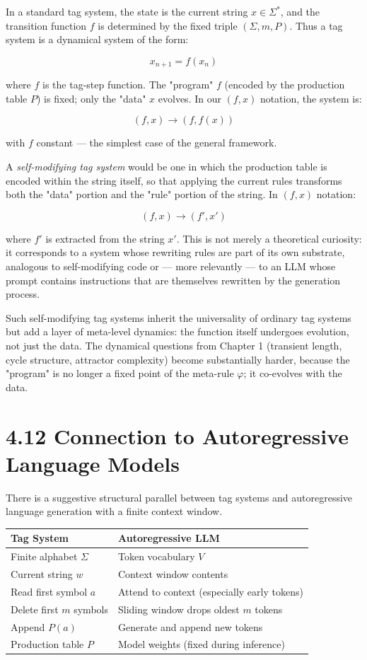 In a standard tag system, the state is the current string $x \in \Sigma^*$, and the transition function $f$ is determined by the fixed triple $(\Sigma, m, P)$. Thus a tag system is a dynamical system of the form:

\[
x_{n+1} = f(x_n)
\]

where $f$ is the tag-step function. The "program" $f$ (encoded by the production table $P$) is fixed; only the "data" $x$ evolves. In our $(f, x)$ notation, the system is:

\[
(f, x) \to (f, f(x))
\]

with $f$ constant --- the simplest case of the general framework.

A \textit{self-modifying tag system} would be one in which the production table is encoded within the string itself, so that applying the current rules transforms both the "data" portion and the "rule" portion of the string. In $(f, x)$ notation:

\[
(f, x) \to (f', x')
\]

where $f'$ is extracted from the string $x'$. This is not merely a theoretical curiosity: it corresponds to a system whose rewriting rules are part of its own substrate, analogous to self-modifying code or --- more relevantly --- to an LLM whose prompt contains instructions that are themselves rewritten by the generation process.

Such self-modifying tag systems inherit the universality of ordinary tag systems but add a layer of meta-level dynamics: the function itself undergoes evolution, not just the data. The dynamical questions from Chapter 1 (transient length, cycle structure, attractor complexity) become substantially harder, because the "program" is no longer a fixed point of the meta-rule $\varphi$; it co-evolves with the data.

\section{4.12 Connection to Autoregressive Language Models}

There is a suggestive structural parallel between tag systems and autoregressive language generation with a finite context window.

\begin{tabular}{|l|l|}
\hline
Tag System & Autoregressive LLM \\
\hline
Finite alphabet $\Sigma$ & Token vocabulary $V$ \\
Current string $w$ & Context window contents \\
Read first symbol $a$ & Attend to context (especially early tokens) \\
Delete first $m$ symbols & Sliding window drops oldest $m$ tokens \\
Append $P(a)$ & Generate and append new tokens \\
Production table $P$ & Model weights (fixed during inference) \\
\hline
\end{tabular}



